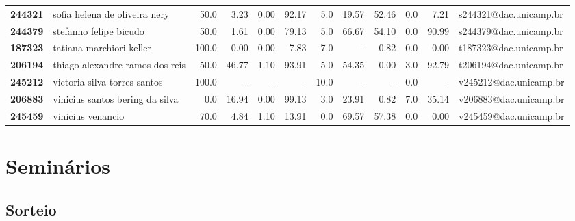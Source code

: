 \documentclass[11pt]{article}
\begin{document}
\begin{center}
\begin{landscape}
\begin{longtable}{llrrrrrrrrrl}
\textbf{244321} &         sofia helena de oliveira nery &                  50.0 &        3.23 &        0.00 &       92.17 &                      5.0 &       19.57 &       52.46 &                        0.0 &        7.21 &  s244321@dac.unicamp.br \\
\textbf{244379} &                stefanno felipe bicudo &                  50.0 &        1.61 &        0.00 &       79.13 &                      5.0 &       66.67 &       54.10 &                        0.0 &       90.99 &  s244379@dac.unicamp.br \\
\textbf{187323} &              tatiana marchiori keller &                 100.0 &        0.00 &        0.00 &        7.83 &                      7.0 &           - &        0.82 &                        0.0 &        0.00 &  t187323@dac.unicamp.br \\
\textbf{206194} &       thiago alexandre ramos dos reis &                  50.0 &       46.77 &        1.10 &       93.91 &                      5.0 &       54.35 &        0.00 &                        3.0 &       92.79 &  t206194@dac.unicamp.br \\
\textbf{245212} &          victoria silva torres santos &                 100.0 &           - &           - &           - &                     10.0 &           - &           - &                        0.0 &           - &  v245212@dac.unicamp.br \\
\textbf{206883} &       vinicius santos bering da silva &                   0.0 &       16.94 &        0.00 &       99.13 &                      3.0 &       23.91 &        0.82 &                        7.0 &       35.14 &  v206883@dac.unicamp.br \\
\textbf{245459} &                     vinicius venancio &                  70.0 &        4.84 &        1.10 &       13.91 &                      0.0 &       69.57 &       57.38 &                        0.0 &        0.00 &  v245459@dac.unicamp.br \\
\end{longtable}
\end{landscape}\end{center}


\section{Seminários}
\label{sec:org5e54e59}
\subsection{Sorteio}
\label{sec:orga20d006}
\end{document}
